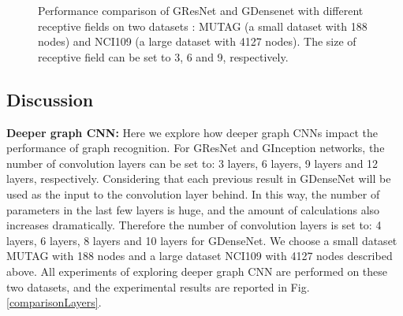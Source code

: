 \documentclass[journal]{IEEEtran}
\begin{document}
\begin{figure*}[ht]
	\centering
	\vspace{-1em}
	\caption{Performance comparison of G\underline{\hspace{0.5em}}ResNet and G\underline{\hspace{0.5em}}Densenet with different receptive fields on two datasets : MUTAG (a small dataset with 188 nodes) and NCI109 (a large dataset with 4127 nodes). The size of receptive field can be set to 3, 6 and 9, respectively.}
	\label{comparisonkernelsize}
\end{figure*}

\subsection{Discussion}
\textbf{Deeper graph CNN:}
Here we explore how deeper graph CNNs impact the performance of graph recognition.
For G\underline{\hspace{0.5em}}ResNet and G\underline{\hspace{0.5em}}Inception networks, the number of convolution layers can be set to: 3 layers, 6 layers, 9 layers and 12 layers, respectively.
Considering that each previous result in G\underline{\hspace{0.5em}}DenseNet will be used as the input to the convolution layer behind. In this way, the number of parameters in the last few layers is huge, and the amount of calculations also increases dramatically. Therefore the number of convolution layers is set to: 4 layers, 6 layers, 8 layers and 10 layers for G\underline{\hspace{0.5em}}DenseNet.
We choose a small dataset MUTAG with 188 nodes and a large dataset NCI109 with 4127 nodes described above. All experiments of exploring deeper graph CNN are performed on these two datasets, and the experimental results are reported in Fig. \ref{comparisonLayers}.
\end{document}
